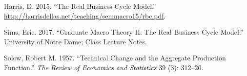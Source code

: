 \documentclass[
  11pt,
  justified]{article}
\newlength{\cslhangindent}
\newlength{\cslentryspacingunit} %
\newenvironment{CSLReferences}[2] %
 {%
  \setlength{\parindent}{0pt}
  \ifodd #1
  \let\oldpar\par
  \def\par{\hangindent=\cslhangindent\oldpar}
  \fi
  \setlength{\parskip}{#2\cslentryspacingunit}
 }%
 {}
\begin{document}
\hypertarget{refs}{}
\begin{CSLReferences}{1}{0}
\leavevmode{}%
Harris, D. 2015. {``The Real Business Cycle Model.''}
\url{http://harrisdellas.net/teaching/semmacro15/rbc.pdf}.

\leavevmode{}%
Sims, Eric. 2017. {``Graduate Macro Theory II: The Real Business Cycle
Model.''} University of Notre Dame; Class Lecture Notes.

\leavevmode{}%
Solow, Robert M. 1957. {``Technical Change and the Aggregate Production
Function.''} \emph{The Review of Economics and Statistics} 39 (3):
312--20.

\end{CSLReferences}
\end{document}
